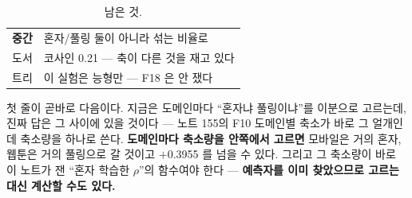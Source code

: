 \documentclass[10pt]{article}
\begin{document}


\begin{table}[t]
\centering\tsize
\caption{남은 것.}
\begin{tabular}{ll}
\toprule
\textbf{중간} & 혼자/풀링 둘이 아니라 섞는 비율로 \\
도서 & 코사인 0.21 --- 축이 다른 것을 재고 있다 \\
트리 & 이 실험은 능형만 --- F18 은 안 쟀다 \\
\bottomrule
\end{tabular}
\end{table}

첫 줄이 곧바로 다음이다. 지금은 도메인마다 ``혼자냐 풀링이냐''를 이분으로
고르는데, 진짜 답은 그 사이에 있을 것이다 --- 노트 155의 F10 도메인별
축소가 바로 그 얼개인데 축소량을 하나로 쓴다. \textbf{도메인마다 축소량을
안쪽에서 고르면} 모바일은 거의 혼자, 웹툰은 거의 풀링으로 갈 것이고
$+$0.3955 를 넘을 수 있다. 그리고 그 축소량이 바로 이 노트가 잰 ``혼자
학습한 $\rho$''의 함수여야 한다 --- \textbf{예측자를 이미 찾았으므로 고르는
대신 계산할 수도 있다.}
\end{document}
